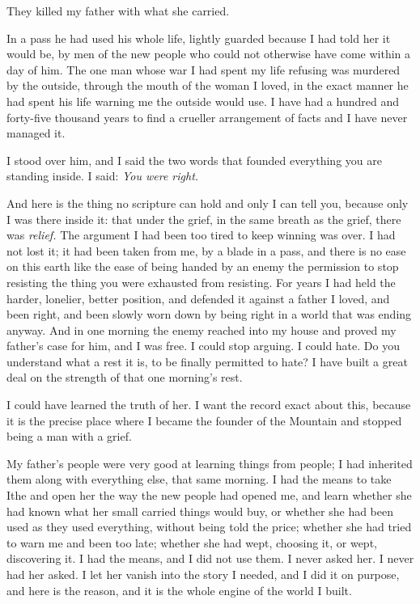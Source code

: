 \ornament

They killed my father with what she carried.\par

In a pass he had used his whole life, lightly guarded because I had told her it would be, by men of the new people who could not otherwise have come within a day of him. The one man whose war I had spent my life refusing was murdered by the outside, through the mouth of the woman I loved, in the exact manner he had spent his life warning me the outside would use. I have had a hundred and forty-five thousand years to find a crueller arrangement of facts and I have never managed it.\par

I stood over him, and I said the two words that founded everything you are standing inside. I said: \emph{You were right.}\par

And here is the thing no scripture can hold and only I can tell you, because only I was there inside it: that under the grief, in the same breath as the grief, there was \emph{relief.} The argument I had been too tired to keep winning was over. I had not lost it; it had been taken from me, by a blade in a pass, and there is no ease on this earth like the ease of being handed by an enemy the permission to stop resisting the thing you were exhausted from resisting. For years I had held the harder, lonelier, better position, and defended it against a father I loved, and been right, and been slowly worn down by being right in a world that was ending anyway. And in one morning the enemy reached into my house and proved my father's case for him, and I was free. I could stop arguing. I could hate. Do you understand what a rest it is, to be finally permitted to hate? I have built a great deal on the strength of that one morning's rest.\par

\ornament

I could have learned the truth of her. I want the record exact about this, because it is the precise place where I became the founder of the Mountain and stopped being a man with a grief.\par

My father's people were very good at learning things from people; I had inherited them along with everything else, that same morning. I had the means to take Ithe and open her the way the new people had opened me, and learn whether she had known what her small carried things would buy, or whether she had been used as they used everything, without being told the price; whether she had tried to warn me and been too late; whether she had wept, choosing it, or wept, discovering it. I had the means, and I did not use them. I never asked her. I never had her asked. I let her vanish into the story I needed, and I did it on purpose, and here is the reason, and it is the whole engine of the world I built.\par

